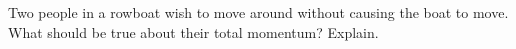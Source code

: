         Two people in a rowboat wish to move around without
        causing the boat to move. What should be true about their
        total momentum? Explain.
